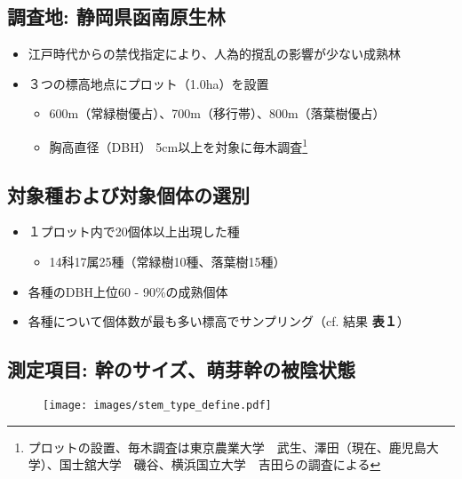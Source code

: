 \documentclass[a0, 30pt, plainboxedsections]{sciposter} %
\begin{document}
\begin{multicols}{4}\footnotesize{

\subsection*{\small{調査地: 静岡県函南原生林}}

\begin{itemize}\setlength{\itemindent}{1em}
  \item 江戸時代からの禁伐指定により、人為的撹乱の影響が少ない成熟林
  \item ３つの標高地点にプロット（1.0ha）を設置
  \begin{itemize}\setlength{\itemindent}{1em}
    \item 600m（常緑樹優占）、700m（移行帯）、800m（落葉樹優占）
    \item 胸高直径（DBH） 5cm以上を対象に毎木調査\footnote{プロットの設置、毎木調査は東京農業大学　武生、澤田（現在、鹿児島大学）、国士舘大学　磯谷、横浜国立大学　吉田らの調査による}
  \end{itemize}
\end{itemize}

\subsection*{\small{対象種および対象個体の選別}}

\begin{itemize}\setlength{\itemindent}{1em}
  \item １プロット内で20個体以上出現した種
  \begin{itemize}\setlength{\itemindent}{1em}
    \item 14科17属25種（常緑樹10種、落葉樹15種）
  \end{itemize}
  \item 各種のDBH上位60 - 90\%の成熟個体
  \item 各種について個体数が最も多い標高でサンプリング（cf. 結果 \textbf{表１}）
\end{itemize}

\columnbreak
\subsection*{\small{測定項目: 幹のサイズ、萌芽幹の被陰状態}}

\begin{figure}
	\centering
	\texttt{[image: images/stem\_type\_define.pdf]}
\end{figure}

}
\end{multicols}
\end{document}
